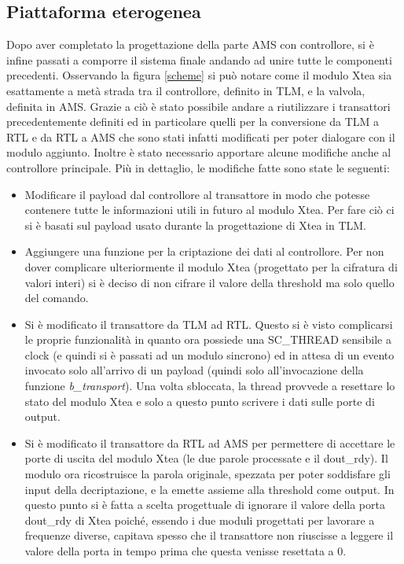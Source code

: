 \documentclass[]{IEEEtran}
\begin{document}
\subsection{Piattaforma eterogenea}
Dopo aver completato la progettazione della parte AMS con controllore, si è infine passati a comporre il sistema finale andando ad unire tutte le componenti precedenti. Osservando la figura \ref{scheme} si può notare come il modulo Xtea sia esattamente a metà strada tra il controllore, definito in TLM, e la valvola, definita in AMS. Grazie a ciò è stato possibile andare a riutilizzare i transattori precedentemente definiti ed in particolare quelli per la conversione da TLM a RTL e da RTL a AMS che sono stati infatti modificati per poter dialogare con il modulo aggiunto. Inoltre è stato necessario apportare alcune modifiche anche al controllore principale.
Più in dettaglio, le modifiche fatte sono state le seguenti:
\begin{itemize}
	\item Modificare il payload dal controllore al transattore in modo che potesse contenere tutte le informazioni utili in futuro al modulo Xtea. Per fare ciò ci si è basati sul payload usato durante la progettazione di Xtea in TLM.
	\item Aggiungere una funzione per la criptazione dei dati al controllore. Per non dover complicare ulteriormente il modulo Xtea (progettato per la cifratura di valori interi) si è deciso di non cifrare il valore della threshold ma solo quello del comando.
	\item Si è modificato il transattore da TLM ad RTL. Questo si è visto complicarsi le proprie funzionalità in quanto ora possiede una SC\_THREAD sensibile a clock (e quindi si è passati ad un modulo sincrono) ed in attesa di un evento invocato solo all'arrivo di un payload (quindi solo all'invocazione della funzione \emph{b\_transport}). Una volta sbloccata, la thread provvede a resettare lo stato del modulo Xtea e solo a questo punto scrivere i dati sulle porte di output.
	\item  Si è modificato il transattore da RTL ad AMS per permettere di accettare le porte di uscita del modulo Xtea (le due parole processate e il dout\_rdy). Il modulo ora ricostruisce la parola originale, spezzata per poter soddisfare gli input della decriptazione, e la emette assieme alla threshold come output. In questo punto si è fatta a scelta progettuale di ignorare il valore della porta dout\_rdy di Xtea poiché, essendo i due moduli progettati per lavorare a frequenze diverse, capitava spesso che il transattore non riuscisse a leggere il valore della porta in tempo prima che questa venisse resettata a 0.
\end{itemize}
\end{document}
